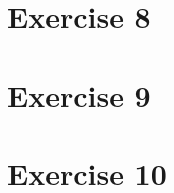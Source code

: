\documentclass[12pt]{article}
\newcommand{\desc}[1]{\textit{#1} \vspace{1em}}
\begin{document}
\clearpage
\section*{Exercise 8}
\desc{}

\clearpage
\section*{Exercise 9}
\desc{}

\clearpage
\section*{Exercise 10}
\desc{}

\clearpage
\end{document}
